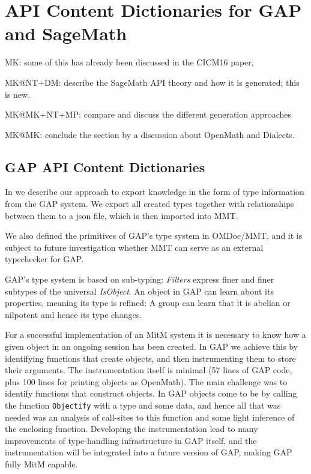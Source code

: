 \section{API Content Dictionaries for GAP and SageMath}\label{sec:apit}
\begin{todolist}{MK: some of this has already been discussed in the CICM16 paper, }
\item MK@NT+DM: describe the SageMath API theory and how it is generated; this is
  new. 
\item MK@MK+NT+MP: compare and discuss the different generation approaches
\item MK@MK: conclude the section by a discussion about OpenMath and Dialects.
\end{todolist}


\subsection{GAP API Content Dictionaries}

In \cite{DehKohKon:iop16} we describe our approach to export knowledge in the
form of type information from the GAP system. We export all created types
together with relationships between them to a json file, which is then imported
into MMT.

We also defined the primitives of GAP's type system in OMDoc/MMT, and it is
subject to future investigation whether MMT can serve as an external typechecker
for GAP.

GAP's type system is based on sub-typing: \emph{Filters} express finer and finer
subtypes of the universal \emph{IsObject}. An object in GAP can learn about its
properties, meaning its type is refined: A group can learn that it is abelian or
nilpotent and hence its type changes.

For a successful implementation of an MitM system it is necessary to know how
a given object in an ongoing session has been created. In GAP we achieve this by
identifying functions that create objects, and then instrumenting them to store
their arguments. The instrumentation itself is minimal (57 lines of GAP code,
plus 100 lines for printing objects as OpenMath). The main challenge was
to identify functions that construct objects. In GAP objects come to be by
calling the function \texttt{Objectify} with a type and some data, and hence all
that was needed was an analysis of call-sites to this function and some light
inference of the enclosing function.
Developing the instrumentation lead to many improvements of type-handling
infrastructure in GAP itself, and the instrumentation will be integrated into a
future version of GAP, making GAP fully MitM capable.

